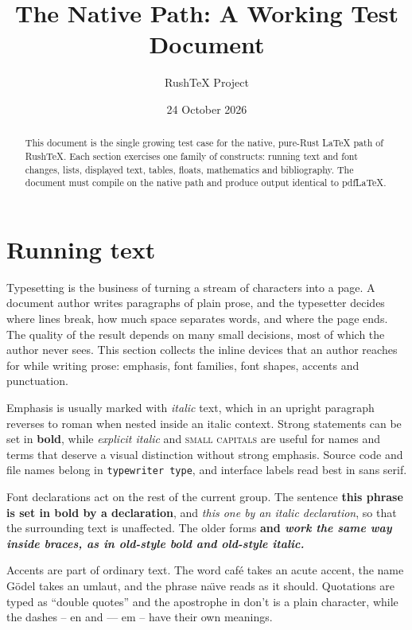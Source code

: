 \documentclass{article}
\title{The Native Path: A Working Test Document}
\author{RushTeX Project}
\date{24 October 2026}
\begin{document}
\maketitle

\begin{abstract}
This document is the single growing test case for the native, pure-Rust LaTeX path of
RushTeX. Each section exercises one family of constructs: running text and font
changes, lists, displayed text, tables, floats, mathematics and bibliography. The
document must compile on the native path and produce output identical to pdfLaTeX.
\end{abstract}

\tableofcontents

\section{Running text}\label{sec:text}

Typesetting is the business of turning a stream of characters into a page. A document
author writes paragraphs of plain prose, and the typesetter decides where lines break,
how much space separates words, and where the page ends. The quality of the result
depends on many small decisions, most of which the author never sees. This section
collects the inline devices that an author reaches for while writing prose: emphasis,
font families, font shapes, accents and punctuation.

Emphasis is usually marked with \emph{italic} text, which in an upright paragraph
reverses to roman when nested inside an italic context. Strong statements can be set in
\textbf{bold}, while \textit{explicit italic} and \textsc{small capitals} are useful for
names and terms that deserve a visual distinction without strong emphasis. Source code
and file names belong in \texttt{typewriter type}, and interface labels read best in
\textsf{sans serif}.

Font declarations act on the rest of the current group. The sentence {\bfseries this
phrase is set in bold by a declaration}, and {\itshape this one by an italic
declaration}, so that the surrounding text is unaffected. The older forms \bf and \it
work the same way inside braces, as in {\bf old-style bold} and {\it old-style italic}.

Accents are part of ordinary text. The word caf\'e takes an acute accent, the name
G\"odel takes an umlaut, and the phrase na\"\i ve reads as it should. Quotations are
typed as ``double quotes'' and the apostrophe in don't is a plain character, while
the dashes -- en and --- em -- have their own meanings.
\end{document}
